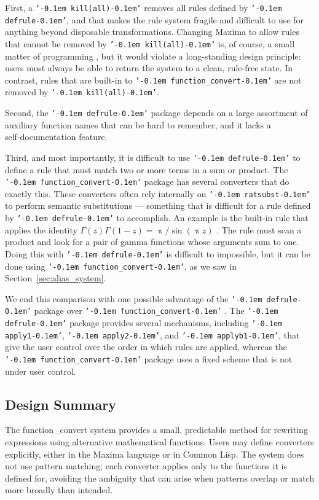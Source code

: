 \documentclass[12pt,fleqn]{extarticle}
\newcommand{\ttq}[1]{\texttt{'\kern-0.1em #1\kern-0.1em'}}
\newcommand{\funconvert}{\ttq{function\_convert}{ }}
\begin{document}
First, a \ttq{kill(all)} removes all rules defined by \ttq{defrule}, and that makes the rule system fragile and difficult to use for anything beyond disposable transformations. Changing Maxima to allow rules that cannot be removed by \ttq{kill(all)} is, of course, a small matter of programming \cite{nardi-small-matter}, but it would violate a long-standing design principle: users must always be able to return the system to a clean, rule-free state.  In contrast, rules that are built-in to \funconvert are not removed by \ttq{kill(all)}.

Second, the \ttq{defrule} package depends on a large assortment of auxiliary function names that can be hard to remember, and it lacks a self‑documentation feature.


Third, and most importantly, it is difficult to use \ttq{defrule} to define a rule that must match two or more terms in a sum or product. The \funconvert package has several converters that do exactly this. These converters often rely internally on \ttq{ratsubst} to perform semantic substitutions --- something that is difficult for a rule defined by \ttq{defrule} to accomplish. An example is the built-in rule that applies the identity \(\Gamma(z)\Gamma(1-z)=\uppi/\sin(\uppi z)\) . The rule must scan a product and look for a pair of gamma functions whose arguments sum to one. Doing this with \ttq{defrule} is difficult to impossible, but it can be done using \ttq{function\_convert},  as we saw in Section~\ref{sec:alias_system}.

We end this comparison with one possible advantage of the \ttq{defrule} package over \funconvert. The \ttq{defrule} package provides several mechanisms, including \ttq{apply1}, \ttq{apply2}, and \ttq{applyb1}, that give the user control over the order in which rules are applied, whereas the \funconvert package uses a fixed scheme that is not under user control.

\subsection{Design Summary}

The function\_convert system provides a small, predictable method for
rewriting expressions using alternative mathematical functions. Users may
define converters explicitly, either in the Maxima language or in Common
Lisp. The system does not use pattern matching; each converter applies
only to the functions it is defined for, avoiding the ambiguity that can
arise when patterns overlap or match more broadly than intended.
\end{document}
